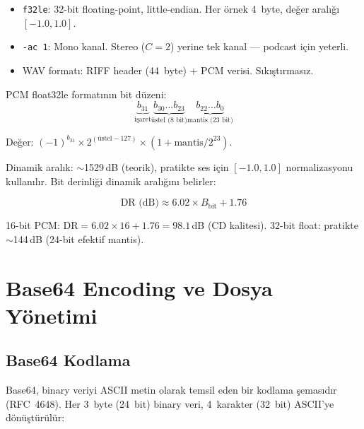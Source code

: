 \begin{itemize}
  \item \texttt{f32le}: 32-bit floating-point, little-endian. Her \"{o}rnek 4~byte, de\u{g}er aral{\i}\u{g}{\i} $[-1.0, 1.0]$.
  \item \texttt{-ac 1}: Mono kanal. Stereo ($C=2$) yerine tek kanal --- podcast i\c{c}in yeterli.
  \item WAV format{\i}: RIFF header (44~byte) + PCM verisi. S{\i}k{\i}\c{s}t{\i}rmas{\i}z.
\end{itemize}

PCM float32le format{\i}n{\i}n bit d\"{u}zeni:
\begin{equation}
\label{eq:float32}
\underbrace{b_{31}}_{\text{i\c{s}aret}} \underbrace{b_{30} \ldots b_{23}}_{\text{\"{u}stel (8 bit)}} \underbrace{b_{22} \ldots b_0}_{\text{mantis (23 bit)}}
\end{equation}

De\u{g}er: $(-1)^{b_{31}} \times 2^{(\text{\"{u}stel} - 127)} \times (1 + \text{mantis}/2^{23})$.

Dinamik aral{\i}k: $\sim$1529\,dB (teorik), pratikte ses i\c{c}in $[-1.0, 1.0]$ normalizasyonu kullan{\i}l{\i}r. Bit derinli\u{g}i dinamik aral{\i}\u{g}{\i}n{\i} belirler:

\begin{equation}
\label{eq:dynamic_range}
\text{DR (dB)} \approx 6.02 \times B_{\text{bit}} + 1.76
\end{equation}

\begin{ornek}
16-bit PCM: $\text{DR} = 6.02 \times 16 + 1.76 = 98.1$\,dB (CD kalitesi). 32-bit float: pratikte $\sim$144\,dB (24-bit efektif mantis).
\end{ornek}


\section{Base64 Encoding ve Dosya Y\"{o}netimi}
\label{sec:base64}

\subsection{Base64 Kodlama}

Base64, binary veriyi ASCII metin olarak temsil eden bir kodlama \c{s}emas{\i}d{\i}r (RFC~4648). Her 3~byte (24~bit) binary veri, 4~karakter (32~bit) ASCII'ye d\"{o}n\"{u}\c{s}t\"{u}r\"{u}l\"{u}r:

